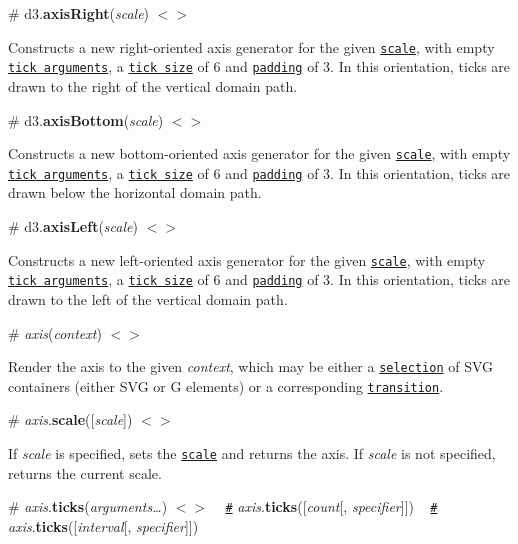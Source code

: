 \label{_axisRight}%
\# d3.{\bfseries axis\+Right}({\itshape scale}) \href{https://github.com/d3/d3-axis/blob/master/src/axis.js#L163}{\tt $<$$>$}

Constructs a new right-\/oriented axis generator for the given \href{https://github.com/d3/d3-scale}{\tt scale}, with empty \href{#axis_ticks}{\tt tick arguments}, a \href{#axis_tickSize}{\tt tick size} of 6 and \href{#axis_tickPadding}{\tt padding} of 3. In this orientation, ticks are drawn to the right of the vertical domain path.

\label{_axisBottom}%
\# d3.{\bfseries axis\+Bottom}({\itshape scale}) \href{https://github.com/d3/d3-axis/blob/master/src/axis.js#L167}{\tt $<$$>$}

Constructs a new bottom-\/oriented axis generator for the given \href{https://github.com/d3/d3-scale}{\tt scale}, with empty \href{#axis_ticks}{\tt tick arguments}, a \href{#axis_tickSize}{\tt tick size} of 6 and \href{#axis_tickPadding}{\tt padding} of 3. In this orientation, ticks are drawn below the horizontal domain path.

\label{_axisLeft}%
\# d3.{\bfseries axis\+Left}({\itshape scale}) \href{https://github.com/d3/d3-axis/blob/master/src/axis.js#L171}{\tt $<$$>$}

Constructs a new left-\/oriented axis generator for the given \href{https://github.com/d3/d3-scale}{\tt scale}, with empty \href{#axis_ticks}{\tt tick arguments}, a \href{#axis_tickSize}{\tt tick size} of 6 and \href{#axis_tickPadding}{\tt padding} of 3. In this orientation, ticks are drawn to the left of the vertical domain path.

\label{__axis}%
\# {\itshape axis}({\itshape context}) \href{https://github.com/d3/d3-axis/blob/master/src/axis.js#L40}{\tt $<$$>$}

Render the axis to the given {\itshape context}, which may be either a \href{https://github.com/d3/d3-selection}{\tt selection} of S\+VG containers (either S\+VG or G elements) or a corresponding \href{https://github.com/d3/d3-transition}{\tt transition}.

\label{_axis_scale}%
\# {\itshape axis}.{\bfseries scale}(\mbox{[}{\itshape scale}\mbox{]}) \href{https://github.com/d3/d3-axis/blob/master/src/axis.js#L120}{\tt $<$$>$}

If {\itshape scale} is specified, sets the \href{https://github.com/d3/d3-scale}{\tt scale} and returns the axis. If {\itshape scale} is not specified, returns the current scale.

\label{_axis_ticks}%
\# {\itshape axis}.{\bfseries ticks}({\itshape arguments…}) \href{https://github.com/d3/d3-axis/blob/master/src/axis.js#L124}{\tt $<$$>$} ~\newline
\href{#axis_ticks}{\tt \#} {\itshape axis}.{\bfseries ticks}(\mbox{[}{\itshape count}\mbox{[}, {\itshape specifier}\mbox{]}\mbox{]}) ~\newline
\href{#axis_ticks}{\tt \#} {\itshape axis}.{\bfseries ticks}(\mbox{[}{\itshape interval}\mbox{[}, {\itshape specifier}\mbox{]}\mbox{]})

